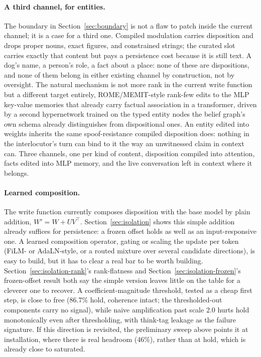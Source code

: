 \paragraph{A third channel, for entities.} The boundary in Section~\ref{sec:boundary}
is not a flaw to patch inside the current channel; it is a case for a third one. Compiled
modulation carries disposition and drops proper nouns, exact figures, and constrained
strings; the curated slot carries exactly that content but pays a persistence cost
because it is still text. A dog's name, a person's role, a fact about a place: none of
these are dispositions, and none of them belong in either existing channel by
construction, not by oversight. The natural mechanism is not more rank in the current
write function but a different target entirely, ROME/MEMIT-style rank-few edits to the
MLP key-value memories that already carry factual association in a transformer, driven
by a second hypernetwork trained on the typed entity nodes the belief graph's own schema
already distinguishes from dispositional ones. An entity edited into weights inherits
the same spoof-resistance compiled disposition does: nothing in the interlocutor's turn
can bind to it the way an unwitnessed claim in context can. Three channels, one per kind
of content, disposition compiled into attention, facts edited into MLP memory, and the
live conversation left in context where it belongs.

\paragraph{Learned composition.} The write function currently composes disposition with
the base model by plain addition, \(W' = W + U V^\top\). Section~\ref{sec:isolation}
shows this simple addition already suffices for persistence: a frozen offset holds as
well as an input-responsive one. A learned composition operator, gating or scaling the
update per token (FiLM- or AdaLN-style, or a routed mixture over several candidate
directions), is easy to build, but it has to clear a real bar to be worth building.
Section~\ref{sec:isolation-rank}'s rank-flatness and Section~\ref{sec:isolation-frozen}'s
frozen-offset result both say the simple version leaves little on the table for a
cleverer one to recover. A coefficient-magnitude threshold, tested as a cheap first
step, is close to free (86.7\% hold, coherence intact; the thresholded-out components
carry no signal), while naive amplification past scale 2.0 hurts hold monotonically even
after thresholding, with think-tag leakage as the failure signature. If this direction
is revisited, the preliminary sweep above points it at installation, where there is real
headroom (46\%), rather than at hold, which is already close to saturated.

